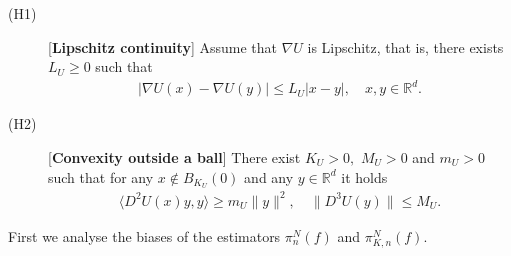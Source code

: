 \documentclass[bj]{imsart}
\begin{document}
\begin{description}
\item[(H1)][\textbf{Lipschitz continuity}] Assume that $\nabla U$ is Lipschitz, that is, there exists $L_U\geq 0$ such that 
\begin{eqnarray*}
|\nabla U(x)-\nabla U(y)|\leq L_U|x-y|, \quad x,y\in \mathbb{R}^d.
\end{eqnarray*}
\item[(H2)][\textbf{Convexity outside a ball}] There exist $K_U>0,$ $M_U>0$ and $m_U>0$ such that for any $x\not\in B_{K_U}(0)	$ and any $y\in \mathbb{R}^d$ it holds 
\begin{eqnarray*}
\langle D^2U(x)y,y\rangle \geq m_U\|y\|^2, \quad \|D^3 U(y)\| \leq M_U. 
\end{eqnarray*}
\end{description}
First we analyse the biases of the estimators
$\pi_n^N(f)$ and $\pi_{K,n}^N(f).$
\end{document}
